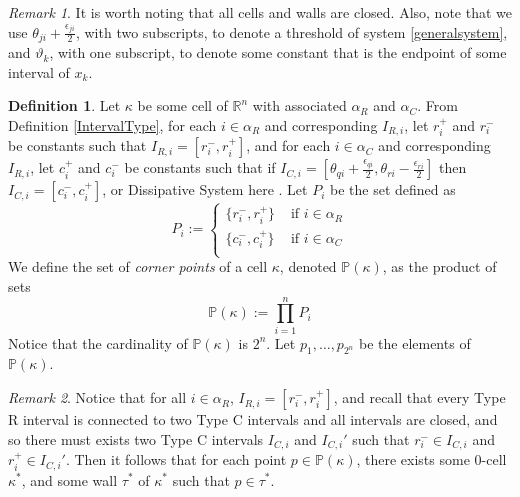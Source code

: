 \documentclass[12pt]{article}
\theoremstyle{definition}
\newtheorem{defn}{Definition}[section]
\theoremstyle{remark}
\newtheorem{remark}{Remark}[section]
\newcommand{\bbR}{\mathbb{R}} %
\newcommand{\bbP}{\mathbb{P}}
\begin{document}
\begin{remark}
It is worth noting that all cells and walls are closed. Also, note that we use $\theta_{ji}+\frac{\epsilon_{ji}}{2}$, with two subscripts, to denote a threshold of system \eqref{generalsystem}, and $\vartheta_k$, with one subscript, to denote some constant that is the endpoint of some interval of $x_k$.
\end{remark}

\begin{defn} \label{cornersetdefn}
Let $\kappa$ be some cell of $\bbR^n$ with associated $\alpha_R$ and $\alpha_C$. From Definition \ref{IntervalType}, for each $i\in\alpha_R$ and corresponding $I_{R,i}$, let $r_i^+$ and $r_i^-$ be constants such that $I_{R,i}=[r_i^-,r_i^+]$, and for each $i\in\alpha_C$ and corresponding $I_{R,i}$, let $c_i^+$ and $c_i^-$ be constants such that if $I_{C,i}=[\theta_{qi}+\frac{\epsilon_{qi}}{2},\theta_{ri}-\frac{\epsilon_{ri}}{2}]$ then $I_{C,i}=[c_i^-,c_i^+]$, or {\color{cyan} Dissipative System here} . Let $P_i$ be the set defined as 
\begin{equation} \label{cornersetequation}
P_i :=
\begin{cases}
\{r_i^-,r_i^+\} &  \text{ if } i\in \alpha_R \\
\{c_i^-,c_i^+\} &  \text{ if } i\in \alpha_C \\
\end{cases}
\end{equation}
We define the set of \textit{corner points} of a cell $\kappa$, denoted $\bbP(\kappa)$, as the product of sets 
\begin{equation*}
\bbP (\kappa) := \prod_{i=1}^n P_i
\end{equation*}
Notice that the cardinality of $\bbP (\kappa)$ is $2^n$. Let $p_1,\dots,p_{2^n}$ be the elements of $\bbP (\kappa)$.
\end{defn}

\begin{remark} \label{cornerpointsin0cell}
Notice that for all $i\in\alpha_R$, $I_{R,i}=[r_i^-,r_i^+]$, and recall that every Type R interval is connected to two Type C intervals and all intervals are closed, and so there must exists two Type C intervals $I_{C,i}$ and $I_{C,i}'$ such that $r_i^-\in I_{C,i}$ and  $r_i^+\in I_{C,i}'$. Then it follows that for each point $p\in\bbP(\kappa)$, there exists some $0$-cell $\kappa^*$, and some wall $\tau^*$ of $\kappa^*$ such that $p\in\tau^*$. 
\end{remark}
\end{document}

